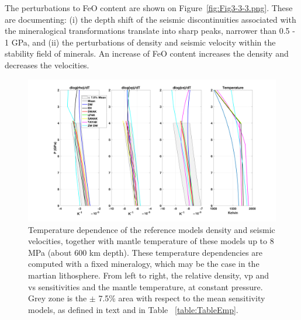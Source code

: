
The perturbations to FeO content are shown on Figure~\ref{fig:Fig3-3-3.png}. These are documenting: (i) the depth shift of the seismic discontinuities associated with the mineralogical transformations translate into sharp peaks, narrower than 0.5 - 1 GPa, and (ii) the perturbations of density and seismic velocity within the stability field of minerals. 
An increase of FeO content increases the density and decreases the velocities.

\begin{figure}[h!]
\begin{center}
\includegraphics[width=1.0\textwidth]
{figures/Fig20_Interior_updated}
\caption{Temperature dependence of the reference models density and seismic velocities, together with mantle temperature of these models up to 8 MPa (about 600 km depth). These temperature dependencies are computed with a fixed mineralogy, which may be the case in the martian lithosphere. From left to right, the relative density, vp and vs sensitivities and the mantle temperature, at constant pressure. Grey zone is the $\pm$ 7.5\% area with respect to the mean sensitivity models, as defined in text and in Table ~\ref{table:TableEmp}.}
\label{fig:Fig20_Interior.png} 
\end{center}
\end{figure}

